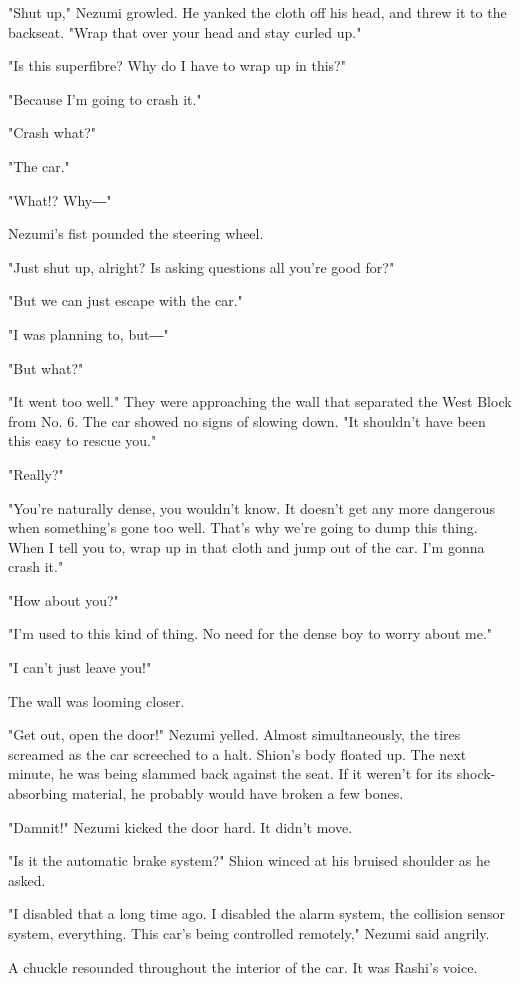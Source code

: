 "Shut up," Nezumi growled. He yanked the cloth off his head, and threw
it to the backseat. "Wrap that over your head and stay curled up."

"Is this superfibre? Why do I have to wrap up in this?"

"Because I'm going to crash it."

"Crash what?"

"The car."

"What!? Why―"

Nezumi's fist pounded the steering wheel.

"Just shut up, alright? Is asking questions all you're good for?"

"But we can just escape with the car."

"I was planning to, but―"

"But what?"

"It went too well." They were approaching the wall that separated the
West Block from No. 6. The car showed no signs of slowing down. "It
shouldn't have been this easy to rescue you."

"Really?"

"You're naturally dense, you wouldn't know. It doesn't get any more
dangerous when something's gone too well. That's why we're going to dump
this thing. When I tell you to, wrap up in that cloth and jump out of
the car. I'm gonna crash it."

"How about you?"

"I'm used to this kind of thing. No need for the dense boy to worry
about me."

"I can't just leave you!"

The wall was looming closer.

"Get out, open the door!" Nezumi yelled. Almost simultaneously, the
tires screamed as the car screeched to a halt. Shion's body floated up.
The next minute, he was being slammed back against the seat. If it
weren't for its shock-absorbing material, he probably would have broken
a few bones.

"Damnit!" Nezumi kicked the door hard. It didn't move.

"Is it the automatic brake system?" Shion winced at his bruised shoulder
as he asked.

"I disabled that a long time ago. I disabled the alarm system, the
collision sensor system, everything. This car's being controlled
remotely," Nezumi said angrily.

A chuckle resounded throughout the interior of the car. It was Rashi's
voice.

